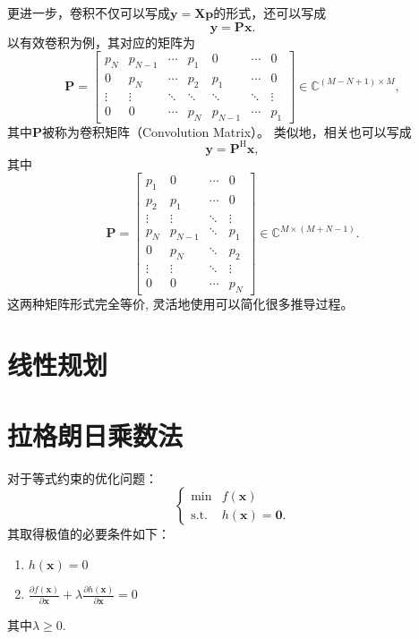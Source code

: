 更进一步，卷积不仅可以写成\( \bm{y} = \mathbf{X} \bm{p} \)的形式，还可以写成
\[
    \bm{y} = \mathbf{P} \bm{x}.
\]
以有效卷积为例，其对应的矩阵为
\[
    \mathbf{P} =
    \begin{bmatrix}
        p_N    & p_{N-1} & \cdots & p_1    & 0       & \cdots & 0      \\
        0      & p_N     & \cdots & p_2    & p_1     & \cdots & 0      \\
        \vdots & \vdots  & \ddots & \ddots & \ddots  & \ddots & \vdots \\
        0      & 0       & \cdots & p_N    & p_{N-1} & \cdots & p_1
    \end{bmatrix}
    \in \mathbb{C}^{(M-N+1) \times M},
\]
其中\( \mathbf{P} \)被称为卷积矩阵（Convolution Matrix）。
类似地，相关也可以写成
\[
    \bm{y} = \mathbf{P}^{\mathrm{H}} \bm{x},
\]
其中
\[
    \mathbf{P} =
    \begin{bmatrix}
        p_1    & 0       & \cdots & 0      \\
        p_2    & p_1     & \cdots & 0      \\
        \vdots & \vdots  & \ddots & \vdots \\
        p_N    & p_{N-1} & \ddots & p_1    \\
        0      & p_N     & \ddots & p_2    \\
        \vdots & \vdots  & \ddots & \vdots \\
        0      & 0       & \cdots & p_N
    \end{bmatrix}
    \in \mathbb{C}^{M \times (M+N-1)}.
\]
这两种矩阵形式完全等价, 灵活地使用可以简化很多推导过程。

\section{线性规划}


\section{拉格朗日乘数法}\label{apx.lagrange-multiplier}
对于等式约束的优化问题：
\[
    \begin{cases}
        \min          & f(\bm{x})           \\
        \mathrm{s.t.} & h(\bm{x}) = \bm{0}.
    \end{cases}
\]
其取得极值的必要条件如下：
\begin{enumerate}
    \item \( h(\bm{x}) = 0 \)
    \item \( \frac{\partial f(\bm{x})}{\partial \bm{x}} + \lambda \frac{\partial h(\bm{x})}{\partial \bm{x}} = 0 \)
\end{enumerate}
其中\( \lambda \geq 0 \).

